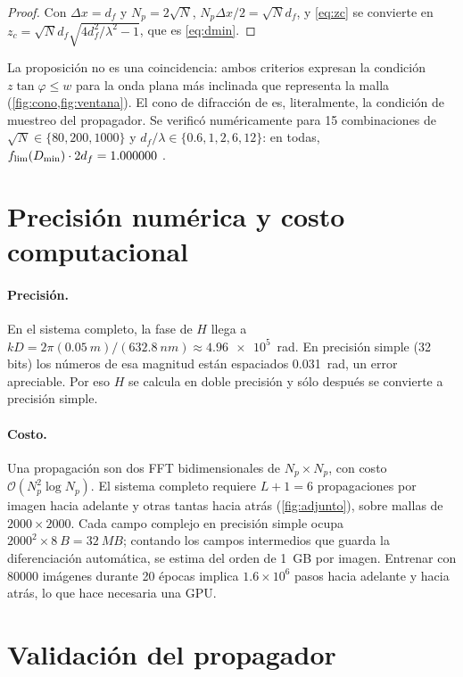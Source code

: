 \begin{proof}
Con $\Delta x=d_f$ y $N_p=2\sqrt N$, $N_p\Delta x/2=\sqrt N d_f$, y \eqref{eq:zc} se convierte en
$z_c=\sqrt N d_f\sqrt{4d_f^2/\lambda^2-1}$, que es \eqref{eq:dmin}.
\end{proof}

\noindent La proposición no es una coincidencia: ambos criterios expresan la condición
$z\tan\varphi\le w$ para la onda plana más inclinada que representa la malla
(\cref{fig:cono,fig:ventana}). El cono de difracción de \textcite{chen2021} es,
literalmente, la condición de muestreo del propagador. Se verificó numéricamente para 15
combinaciones de $\sqrt N\in\{80,200,1000\}$ y $d_f/\lambda\in\{0.6,1,2,6,12\}$: en todas,
$f_{\lim}(D_{\min})\cdot2d_f=1.000000$ \parencite{repo2026}.

\section{Precisión numérica y costo computacional}\label{sec:costo}

\paragraph{Precisión.} En el sistema completo, la fase de $H$ llega a
$kD=2\pi(\SI{0.05}{m})/(\SI{632.8}{nm})\approx\num{4.96e5}$~rad. En precisión simple (32 bits)
los números de esa magnitud están espaciados \SI{0.031}{rad}, un error apreciable. Por eso
$H$ se calcula en doble precisión y sólo después se convierte a precisión simple.

\paragraph{Costo.} Una propagación son dos FFT bidimensionales de $N_p\times N_p$, con costo
$\mathcal{O}(N_p^2\log N_p)$. El sistema completo requiere $L+1=6$ propagaciones por imagen
hacia adelante y otras tantas hacia atrás (\cref{fig:adjunto}), sobre mallas de
$2000\times2000$. Cada campo complejo en precisión simple ocupa
$2000^2\times\SI{8}{B}=\SI{32}{MB}$; contando los campos intermedios que guarda la
diferenciación automática, se estima del orden de \SI{1}{GB} por imagen. Entrenar con
\num{80000} imágenes durante 20 épocas implica $1.6\times10^6$ pasos hacia adelante y hacia
atrás, lo que hace necesaria una GPU.

\section{Validación del propagador}\label{sec:validacion}

